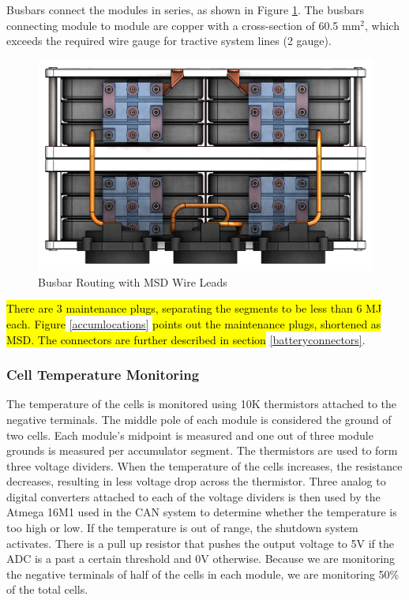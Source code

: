 \documentclass{article}
\DeclareRobustCommand{\hlr}[1]{{\sethlcolor{red}\hl{#1}}}
\begin{document}
            Busbars connect the modules in series, as shown in Figure \ref{busbar}. The busbars connecting module to module are copper with a cross-section of 60.5 mm$^2$, which exceeds the required wire gauge for tractive system lines (2 gauge).
            
            \begin{figure}[H]
                \centering
                \includegraphics[width = 0.6 \textwidth]{busbar_routing}
                \caption{Busbar Routing with MSD Wire Leads}
                \label{busbar}
            \end{figure}

            \hlr{There are 3 maintenance plugs, separating the segments to be less than 6 MJ each. Figure }\ref{accumlocations} \hlr{ points out the maintenance plugs, shortened as MSD. The connectors are further described in section} \ref{batteryconnectors}.
    
        \subsubsection{Cell Temperature Monitoring} %

            
            The temperature of the cells is monitored using 10K thermistors attached to the negative terminals. The middle pole of each module is considered the ground of two cells. Each module’s midpoint is measured and one out of three module grounds is measured per accumulator segment. The thermistors are used to form three voltage dividers. When the temperature of the cells increases, the resistance decreases, resulting in less voltage drop across the thermistor. Three analog to digital converters attached to each of the voltage dividers is then used by the Atmega 16M1 used in the CAN system to determine whether the temperature is too high or low. If the temperature is out of range, the shutdown system activates. There is a pull up resistor that pushes the output voltage to 5V if the ADC is a past a certain threshold and 0V otherwise. Because we are monitoring the negative terminals of half of the cells in each module, we are monitoring 50\% of the total cells.
            
\end{document}
